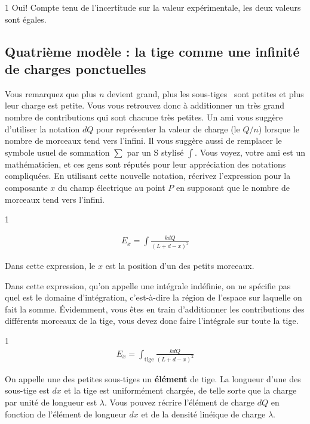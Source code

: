 \documentclass{tufte-handout}
\def\reponse{1}
\begin{document}
\if\reponse1
  {\color{tblue}
    Oui! Compte tenu de l'incertitude sur la valeur expérimentale, les deux
    valeurs sont égales.
  }
\else
  \vspace{1cm}
\fi


\subsection{Quatrième modèle : la tige comme une infinité de charges
  ponctuelles}

Vous remarquez que plus $n$ devient grand, plus les \og sous-tiges \fg\ sont
petites et plus leur charge est petite. Vous vous retrouvez donc à additionner
un très grand nombre de contributions qui sont chacune très petites. Un ami
vous suggère d'utiliser la notation $dQ$ pour représenter la valeur de charge
(le $Q / n$) lorsque le nombre de morceaux tend vers l'infini. Il vous suggère
aussi de remplacer le symbole usuel de sommation $\sum$ par un S stylisé
$\int$. Vous voyez, votre ami est un mathématicien, et ces gens sont réputés
pour leur appréciation des notations compliquées. En utilisant cette nouvelle
notation, récrivez l'expression pour la composante $x$ du champ électrique au
point $P$ en supposant que le nombre de morceaux tend vers l'infini.

\if\reponse1
  {\color{tblue}
    \begin{align*}
      E_{x} = \int \frac{k dQ}{(L + d - x)^2}
    \end{align*}

    Dans cette expression, le $x$ est la position d'un des petits morceaux.
  }
\else
  \vspace{1cm}
\fi

Dans cette expression, qu'on appelle une intégrale indéfinie, on ne spécifie
pas quel est le domaine d'intégration, c'est-à-dire la région de l'espace sur
laquelle on fait la somme. Évidemment, vous êtes en train d'additionner les
contributions des différents morceaux de la tige, vous devez donc faire
l'intégrale sur toute la tige.

\if\reponse1
  {\color{tblue}
    \begin{align*}
      E_{x} = \int_\mathrm{tige} \frac{k dQ}{(L + d - x)^2}
    \end{align*}
  }
\else
  \vspace{1cm}
\fi

On appelle une des petites sous-tiges un \textbf{élément} de tige. La
longueur d'une des sous-tige est $dx$ et la tige est uniformément chargée,
de telle sorte que la charge par unité de longueur est $\lambda$. Vous pouvez
récrire l'élément de charge $dQ$ en fonction de l'élément de longueur $dx$ et
de la densité linéique de charge $\lambda$.
\end{document}
